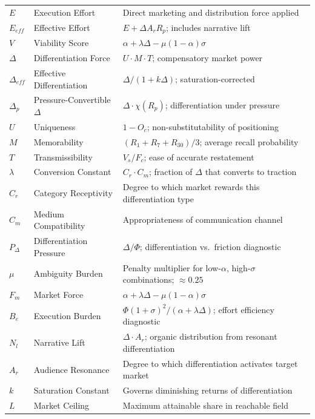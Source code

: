 \documentclass[12pt, openany]{book}
\theoremstyle{thmstyle}
\theoremstyle{defstyle}
\newcommand{\Fm}{F_m}
\begin{document}
\begin{longtable}{@{}p{1.0in} p{1.3in} p{3.5in}@{}}
$E$ & Execution Effort & Direct marketing and distribution force applied \\[3pt]
$E_{eff}$ & Effective Effort & $E + \Delta A_r R_p$; includes narrative lift \\[3pt]
$V$ & Viability Score & $\alpha + \lambda\Delta - \mu(1-\alpha)\sigma$ \\[3pt]
$\Delta$ & Differentiation Force & $U \cdot M \cdot T$; compensatory market power \\[3pt]
$\Delta_{eff}$ & Effective Differentiation & $\Delta/(1+k\Delta)$; saturation-corrected \\[3pt]
$\Delta_p$ & Pressure-Convertible $\Delta$ & $\Delta \cdot \chi(R_p)$; differentiation under pressure \\[3pt]
$U$ & Uniqueness & $1 - O_c$; non-substitutability of positioning \\[3pt]
$M$ & Memorability & $(R_1+R_7+R_{30})/3$; average recall probability \\[3pt]
$T$ & Transmissibility & $V_s/F_c$; ease of accurate restatement \\[3pt]
$\lambda$ & Conversion Constant & $C_r \cdot C_m$; fraction of $\Delta$ that converts to traction \\[3pt]
$C_r$ & Category Receptivity & Degree to which market rewards this differentiation type \\[3pt]
$C_m$ & Medium Compatibility & Appropriateness of communication channel \\[3pt]
$P_\Delta$ & Differentiation Pressure & $\Delta/\Phi$; differentiation vs.\ friction diagnostic \\[3pt]
$\mu$ & Ambiguity Burden & Penalty multiplier for low-$\alpha$, high-$\sigma$ combinations; $\approx 0.25$ \\[3pt]
$\Fm$ & Market Force & $\alpha + \lambda\Delta - \mu(1-\alpha)\sigma$ \\[3pt]
$B_e$ & Execution Burden & $\Phi(1+\sigma)^2/(\alpha+\lambda\Delta)$; effort efficiency diagnostic \\[3pt]
$N_l$ & Narrative Lift & $\Delta \cdot A_r$; organic distribution from resonant differentiation \\[3pt]
$A_r$ & Audience Resonance & Degree to which differentiation activates target market \\[3pt]
$k$ & Saturation Constant & Governs diminishing returns of differentiation \\[3pt]
$L$ & Market Ceiling & Maximum attainable share in reachable field \\[3pt]

\end{longtable}
\end{document}
